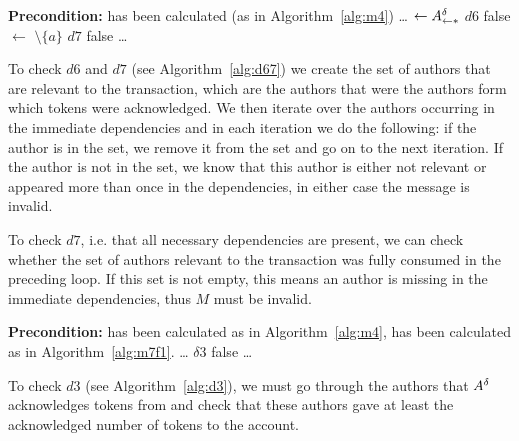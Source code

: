 \documentclass{article}
\begin{document}
\begin{algorithm}[ht]
    \caption{Code snippet verifying $d6$ and $d7$}
    \label{alg:d67}
\begin{algorithmic}
    \Statex \textbf{Precondition:}  has been calculated (as in Algorithm~\ref{alg:m4})
    \Statex \ldots \vphantom{I}
    \State {} $\gets A^\delta_{\leftarrow*}$
     \Comment $d6$
            \State \Return false
        \EndIf
        \State {} $\gets$  $\setminus \{a\}$
    \EndFor
     \Comment $d7$
        \State \Return false
    \EndIf
    \Statex \ldots \vphantom{I}
\end{algorithmic}
\end{algorithm}
To check $d6$ and $d7$ (see Algorithm~\ref{alg:d67}) we create the set of authors  that are relevant to the transaction, which are the authors that were the authors form which tokens were acknowledged. We then iterate over the authors occurring in the immediate dependencies and in each iteration we do the following: if the author is in the set, we remove it from the set and go on to the next iteration. If the author is not in the set, we know that this author is either not relevant or appeared more than once in the dependencies, in either case the message is invalid.

To check $d7$, i.e. that all necessary dependencies are present, we can check whether the set of authors relevant to the transaction was fully consumed in the preceding loop. If this set is not empty, this means an author is missing in the immediate dependencies, thus $M$ must be invalid.
\\

\begin{algorithm}[ht]
    \caption{Code snippet verifying $d3$}
    \label{alg:d3}
\begin{algorithmic}
    \Statex \textbf{Precondition:}  has been calculated as in Algorithm~\ref{alg:m4},  has been calculated as in Algorithm~\ref{alg:m7f1}.
    \Statex \ldots \vphantom{I}
     \Comment $\delta3$
            \State \Return false
        \EndIf
    \EndFor
    \Statex \ldots \vphantom{I}
\end{algorithmic}
\end{algorithm}
To check $d3$ (see Algorithm~\ref{alg:d3}), we must go through the authors that $A^\delta$ acknowledges tokens from and check that these authors gave at least the acknowledged number of tokens to the account.
\end{document}
